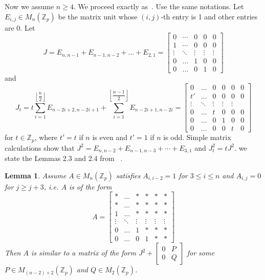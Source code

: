 \documentclass[12pt,a4paper]{article}
\newtheorem{lem}{Lemma}[section]
\begin{document}
	Now we assume $n \geq 4$. We proceed exactly as~\cite{Koo2025}. Use the same notations. Let $E_{i,j} \in M_n(\mathbb{Z}_p)$ be the matrix unit whose $(i,j)$-th entry is 1 and other entries are 0. Let
	\begin{equation*}
		J=E_{n,n-1}+E_{n-1,n-2}+\ldots+E_{2,1}=\begin{bmatrix}
			0&\cdots &0&0&0\\
			1&\cdots &0&0&0\\
			\vdots&\ddots&\vdots&\vdots&\vdots \\
			0&\ldots & 1&0&0 \\
			0&\ldots&0&1&0
		\end{bmatrix}
	\end{equation*}
	and
	\begin{equation*}
		J_t=t\sum_{i=1}^{\left\lfloor \dfrac{n}{2}\right\rfloor}E_{n-2i+2,n-2i+1} + \sum_{i=1}^{\left\lfloor \dfrac{n-1}{2}\right\rfloor}E_{n-2i+1,n-2i}=\begin{bmatrix}
			0&\ldots&0&0&0&0 \\
			t'&\ldots&0&0&0&0 \\
			\vdots&\ddots&\vdots&\vdots&\vdots \\
			0&\ldots&t&0&0&0\\
			0&\ldots&0&1&0&0 \\
			0&\ldots&0&0&t&0
		\end{bmatrix}
	\end{equation*}
	for $t \in \mathbb{Z}_p$, where $t'=t$ if $n$ is even and $t'=1$ if $n$ is odd. Simple matrix calculations show that $J^2=E_{n,n-2} + E_{n-1,n-3} + \cdots +E_{3,1}$ and $J_t^2 = tJ^2$. we state the Lemmas 2.3 and 2.4 from ~\cite{Koo2025}.
	\begin{lem} \label{Lemma 2.3 of Koo}
		Assume $A \in M_n(\mathbb{Z}_p)$ satisfies $A_{i,i-2}=1$ for $3 \leq i \leq n$ and $A_{i,j}=0$ for $j \geq j+3$, i.e. $A$ is of the form $$A= \begin{bmatrix}
			* & \ldots &*&*&*&*\\
			* & \ldots &*&*&*&*\\
			1 & \ldots &*&*&*&*\\
			\vdots & \ddots & \vdots &\vdots &\vdots &\vdots\\
			0 & \ldots &1&*&*&*\\
			0 & \ldots &0&1&*&*
		\end{bmatrix}$$
		Then $A$ is similar to a matrix of the form $J^2 + \begin{bmatrix}
			0 & P\\
			0 & Q
		\end{bmatrix}$ for some $P \in M_{(n-2) \times 2}(\mathbb{Z}_p)$ and $Q \in M_2(\mathbb{Z}_p)$.
	\end{lem}
\end{document}
